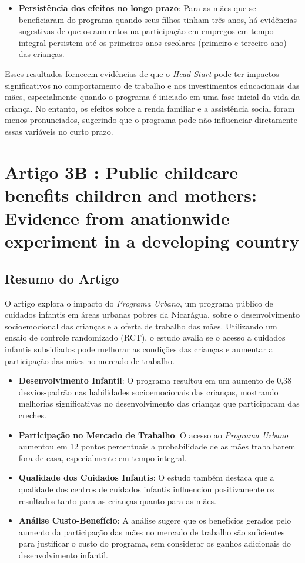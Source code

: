 \documentclass[a4paper,12pt]{article}[abntex2]
\begin{document}
\begin{itemize}
    \item \textbf{Persistência dos efeitos no longo prazo}: Para as mães que se beneficiaram do programa quando seus filhos tinham três anos, há evidências sugestivas de que os aumentos na participação em empregos em tempo integral persistem até os primeiros anos escolares (primeiro e terceiro ano) das crianças.
\end{itemize}

Esses resultados fornecem evidências de que o \textit{Head Start} pode ter impactos significativos no comportamento de trabalho e nos investimentos educacionais das mães, especialmente quando o programa é iniciado em uma fase inicial da vida da criança. No entanto, os efeitos sobre a renda familiar e a assistência social foram menos pronunciados, sugerindo que o programa pode não influenciar diretamente essas variáveis no curto prazo.

\newpage

\section{\textbf{Artigo 3B : Public childcare beneﬁts children and mothers: Evidence from anationwide experiment in a developing country}}
\subsection{\textbf{Resumo do Artigo}}
O artigo explora o impacto do \textit{Programa Urbano}, um programa público de cuidados infantis em áreas urbanas pobres da Nicarágua, sobre o desenvolvimento socioemocional das crianças e a oferta de trabalho das mães. Utilizando um ensaio de controle randomizado (RCT), o estudo avalia se o acesso a cuidados infantis subsidiados pode melhorar as condições das crianças e aumentar a participação das mães no mercado de trabalho.

\begin{itemize}
    \item \textbf{Desenvolvimento Infantil}: O programa resultou em um aumento de 0,38 desvios-padrão nas habilidades socioemocionais das crianças, mostrando melhorias significativas no desenvolvimento das crianças que participaram das creches.
    \item \textbf{Participação no Mercado de Trabalho}: O acesso ao \textit{Programa Urbano} aumentou em 12 pontos percentuais a probabilidade de as mães trabalharem fora de casa, especialmente em tempo integral.
    \item \textbf{Qualidade dos Cuidados Infantis}: O estudo também destaca que a qualidade dos centros de cuidados infantis influenciou positivamente os resultados tanto para as crianças quanto para as mães.
    \item \textbf{Análise Custo-Benefício}: A análise sugere que os benefícios gerados pelo aumento da participação das mães no mercado de trabalho são suficientes para justificar o custo do programa, sem considerar os ganhos adicionais do desenvolvimento infantil.
\end{itemize}
\end{document}
